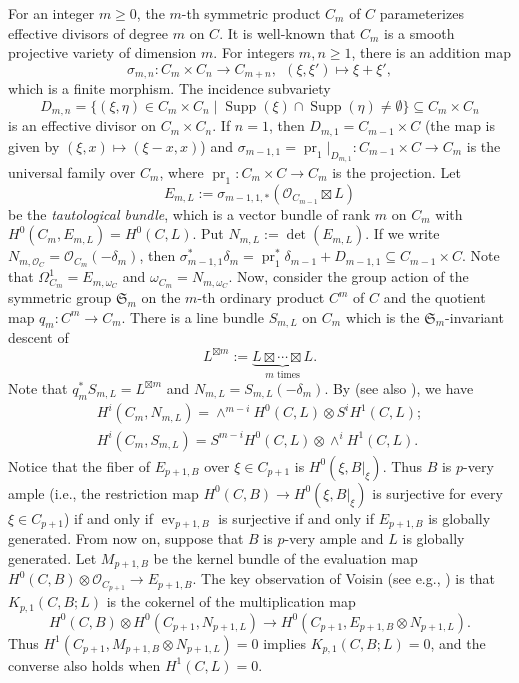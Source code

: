 \documentclass[graybox]{svmult}
\newcommand{\sO}{\mathscr{O}}
\def\Supp{\operatorname{Supp}}
\DeclareMathOperator{\pr}{pr}
\begin{document}
For an integer $m \geq 0$, the $m$-th symmetric product $C_m$ of $C$ parameterizes effective divisors of degree $m$ on $C$. It is well-known that $C_m$ is a smooth projective variety of dimension $m$. For integers $m,n \geq 1$, there is an addition map
$$
\sigma_{m,n} \colon C_{m}\times C_n \longrightarrow C_{m+n},~~(\xi,\xi') \longmapsto \xi+\xi',
$$
which is a finite morphism.
The incidence subvariety 
$$
D_{m,n} = \{(\xi, \eta) \in C_{m} \times C_{n} \mid \Supp(\xi) \cap \Supp(\eta) \neq \emptyset\} \subseteq C_m \times C_n
$$ 
is an effective divisor on $C_m \times C_n$. If $n=1$, then $D_{m,1}=C_{m-1} \times C$ (the map is given by $(\xi,x) \mapsto (\xi-x, x)$) and $\sigma_{m-1,1}  = \pr_1|_{D_{m,1}} \colon C_{m-1} \times C \to C_m$ is the universal family over $C_{m}$, where $\pr_1 \colon C_m \times C \to C_m$ is the projection. Let 
$$
E_{m,L}:=\sigma_{m-1,1,*} (\sO_{C_{m-1}} \boxtimes L)
$$
be the  \emph{tautological bundle}, which is a vector bundle of rank $m$ on $C_{m}$ with $H^0(C_m, E_{m,L})=H^0(C, L)$. Put $N_{m,L}:=\det (E_{m,L})$. If we write $N_{m,\sO_C}=\sO_{C_{m}}(-\delta_{m})$, then $\sigma_{m-1,1}^*\delta_{m} = \pr_1^* \delta_{m-1} +
D_{m-1,1} \subseteq C_{m-1} \times C$. Note that $\Omega_{C_m}^1=E_{m, \omega_C}$ and $\omega_{C_m} = N_{m, \omega_C}$. Now, consider the group action of the symmetric group $\mathfrak{S}_{m}$ on the $m$-th ordinary product $C^m$ of $C$ and the quotient map $q_m \colon C^m \to C_m$. There is a line bundle $S_{m, L}$ on $C_{m}$ which is the $\mathfrak{S}_{m}$-invariant descent of 
$$
L^{\boxtimes m}:=\underbrace{L\boxtimes  \cdots \boxtimes L}_{\text{$m$ times}}.
$$ 
Note that $q_m^* S_{m,L} = L^{\boxtimes m}$ and $N_{m, L} = S_{m, L}(-\delta_{m})$. By \cite[Lemma 3.7]{ENP1} (see also \cite[Lemma 2.4]{Agostini2}), we have
$$
\begin{array}{l}
H^i(C_m, N_{m,L}) = \wedge^{m-i} H^0(C, L) \otimes S^i H^1(C, L);\\
H^i(C_m, S_{m,L}) = S^{m-i} H^0(C, L) \otimes \wedge^i H^1(C, L).
\end{array}
$$
Notice that the fiber of $E_{p+1, B}$ over $\xi \in C_{p+1}$ is $H^0(\xi, B|_{\xi})$. Thus $B$ is $p$-very ample (i.e., the restriction map $H^0(C, B) \to H^0(\xi, B|_{\xi})$ is surjective for every $\xi \in C_{p+1}$) if and only if $\operatorname{ev}_{p+1, B}$ is surjective if and only if $E_{p+1, B}$ is globally generated. From now on, suppose that $B$ is $p$-very ample and $L$ is globally generated. Let $M_{p+1, B}$ be the kernel bundle of the evaluation map $H^0(C, B) \otimes \sO_{C_{p+1}} \to E_{p+1, B}$. The key observation of Voisin (see e.g., \cite[Lemma 1.1]{EL2}) is that $K_{p,1}(C, B; L)$ is the cokernel of the multiplication map
$$
H^0(C, B)\otimes H^0(C_{p+1}, N_{p+1,L})\longrightarrow H^0(C_{p+1}, E_{p+1,B}\otimes N_{p+1,L}).
$$
Thus $H^1(C_{p+1}, M_{p+1, B} \otimes N_{p+1, L})=0$ implies $K_{p,1}(C, B; L) = 0$, and the converse also holds when $H^1(C,L)=0$.
\end{document}
